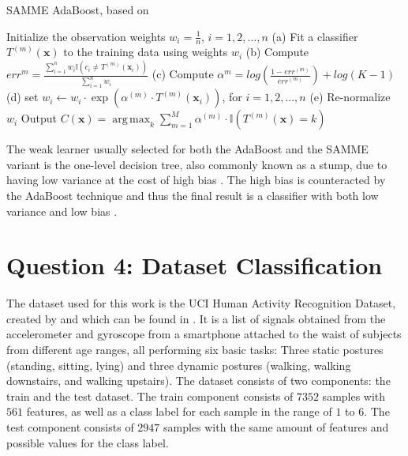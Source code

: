 \documentclass{article}
\DeclareMathOperator*{\argmax}{arg\,max}
\begin{document}
\begin{algorithm}
	\caption{SAMME AdaBoost, based on \cite{multi_class_adaboost}} 
	\label{Alg:SAMME}
	\begin{algorithmic}[1]
	\State Initialize the observation weights $w_{i} = \frac{1}{n}$, $i = 1,2,...,n$
	    \State (a) Fit a classifier $T^{(m)}(\mathbf{x})$ to the training data using weights $w_{i}$
	    \State (b) Compute $err^{m} = \frac{\sum_{i=1}^{n}w_{i}\mathbb{I}(c_{i} \neq T^{(m)}(\mathbf{x}_{i}))}{\sum_{i=1}^{n}w_{i}}$
	    \State (c) Compute $\alpha^{m} = log(\frac{1 - err^{(m)}}{err^{(m)}}) + log(K-1)$
	    \State (d) set $w_{i} \leftarrow w_{i} \cdot \exp (\alpha^{(m)} \cdot T^{(m)}(\mathbf{x}_{i}))$, for $i = 1,2,...,n$
	    \State (e) Re-normalize $w_{i}$
	\EndFor
	\State Output $C(\mathbf{x}) = \argmax_k \sum_{m=1}^{M} \alpha^{(m)} \cdot \mathbb{I} (T^{(m)}(\mathbf{x}) = k)$ 
	\end{algorithmic} 
\end{algorithm}

The weak learner usually selected for both the AdaBoost and the SAMME variant is the one-level decision tree, also commonly known as a stump, due to having low variance at the cost of high bias \cite{adaboost_forward_stagewise_additive}. The high bias is counteracted by the AdaBoost technique and thus the final result is a classifier with both low variance and low bias \cite{Sun_boosting_imbalanced_data}.


\section{Question 4: Dataset Classification}
\label{sec:Q4}

The dataset used for this work is the UCI Human Activity Recognition Dataset, created by \cite{Human_Activity_Recognition_Dataset} and which can be found in \cite{Human_Activity_Recognition_Dataset_url}. It is a list of signals obtained from the accelerometer and gyroscope from a smartphone attached to the waist of subjects from different age ranges, all performing six basic tasks: Three static postures (standing, sitting, lying) and three dynamic postures (walking, walking downstairs, and walking upstairs).
The dataset consists of two components: the train and the test dataset. The train component consists of $7352$ samples with $561$ features, as well as a class label for each sample in the range of $1$ to $6$. The test component consists of $2947$ samples with the same amount of features and possible values for the class label.
\end{document}

